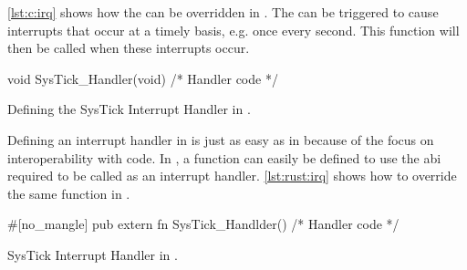 \autoref{lst:c:irq} shows how the  can be overridden in {\C}.
The {\gecko} can be triggered to cause interrupts that occur at a timely basis, e.g. once every second.
This function will then be called when these interrupts occur.

\begin{listing}[H]
  \begin{ccode}
void SysTick_Handler(void) { /* Handler code */ }
  \end{ccode}
  \caption{Defining the SysTick Interrupt Handler in {\C}.}
  \label{lst:c:irq}
\end{listing}

Defining an interrupt handler in {\rust} is just as easy as in {\C} because of the focus on interoperability with {\C} code.
In {\rust}, a function can easily be defined to use the {\C} \glsdesc{abi} required to be called as an interrupt handler.
\autoref{lst:rust:irq} shows how to override the same  function in {\rust}.

\begin{listing}[H]
  \begin{rustcode}
#[no_mangle] pub extern fn SysTick_Handlder() { /* Handler code */ }
  \end{rustcode}
  \caption{SysTick Interrupt Handler in {\rust}.}
  \label{lst:rust:irq}
\end{listing}

